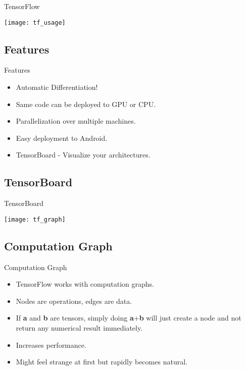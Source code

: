 \begin{frame}{TensorFlow}
	\begin{center}
		\texttt{[image: tf\_usage]}
	\end{center}
\end{frame}

\subsection{Features}
\begin{frame}{Features}
	\begin{itemize}
		\item Automatic Differentiation!
		\item Same code can be deployed to GPU or CPU.
		\item Parallelization over multiple machines.
		\item Easy deployment to Android.
		\item TensorBoard - Visualize your architectures.
	\end{itemize}
\end{frame}


\subsection{TensorBoard}
\begin{frame}{TensorBoard}
	\begin{center}
		\texttt{[image: tf\_graph]}
	\end{center}
\end{frame}

\subsection{Computation Graph}
\begin{frame}{Computation Graph}
	\begin{itemize}
		\item TensorFlow works with computation graphs.
		\item Nodes are operations, edges are data.
		\item If \textbf{a} and \textbf{b} are tensors, simply doing \textbf{a}+\textbf{b} will just create a node and not return any numerical result immediately.
		\item Increases performance.
		\item Might feel strange at first but rapidly becomes natural.
	\end{itemize}
\end{frame}

